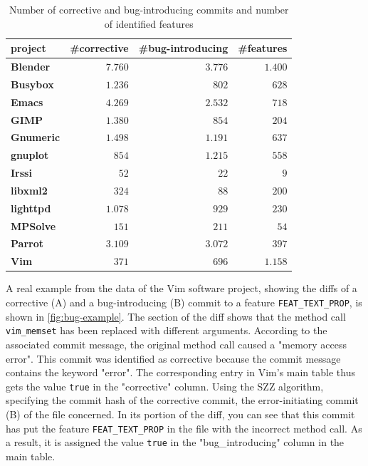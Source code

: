 \begin{table}[t]
\centering
\caption{Number of corrective and bug-introducing commits and number of identified features}
\label{tab:tools-values2}
\begin{tabular}{@{}lrrr@{}}
\toprule
project           & \#corrective & \#bug-introducing & \#features \\ \midrule
\textbf{Blender}  & $7.760$      & $3.776$           & $1.400$    \\
\textbf{Busybox}  & $1.236$      & $802$             & $628$      \\
\textbf{Emacs}    & $4.269$      & $2.532$           & $718$      \\
\textbf{GIMP}     & $1.380$      & $854$             & $204$      \\
\textbf{Gnumeric} & $1.498$      & $1.191$           & $637$      \\
\textbf{gnuplot}  & $854$        & $1.215$           & $558$      \\
\textbf{Irssi}    & $52$         & $22$              & $9$        \\
\textbf{libxml2}  & $324$        & $88$              & $200$      \\
\textbf{lighttpd} & $1.078$      & $929$             & $230$      \\
\textbf{MPSolve}  & $151$        & $211$             & $54$       \\
\textbf{Parrot}   & $3.109$      & $3.072$           & $397$      \\
\textbf{Vim}      & $371$        & $696$             & $1.158$    \\ \bottomrule
\end{tabular}
\end{table}

A real example from the data of the Vim software project, showing the diffs of a corrective (A) and a bug-introducing (B) commit to a feature \texttt{FEAT\_TEXT\_PROP}, is shown in \autoref{fig:bug-example}. The section of the diff shows that the method call \texttt{vim\_memset} has been replaced with different arguments. According to the associated commit message, the original method call caused a "memory access error". This commit was identified as corrective because the commit message contains the keyword "error". The corresponding entry in Vim's main table thus gets the value \texttt{true} in the "corrective" column. Using the SZZ algorithm, specifying the commit hash of the corrective commit, the error-initiating commit (B) of the file concerned. In its portion of the diff, you can see that this commit has put the feature \texttt{FEAT\_TEXT\_PROP} in the file with the incorrect method call. As a result, it is assigned the value \texttt{true} in the "bug\_introducing" column in the main table.


